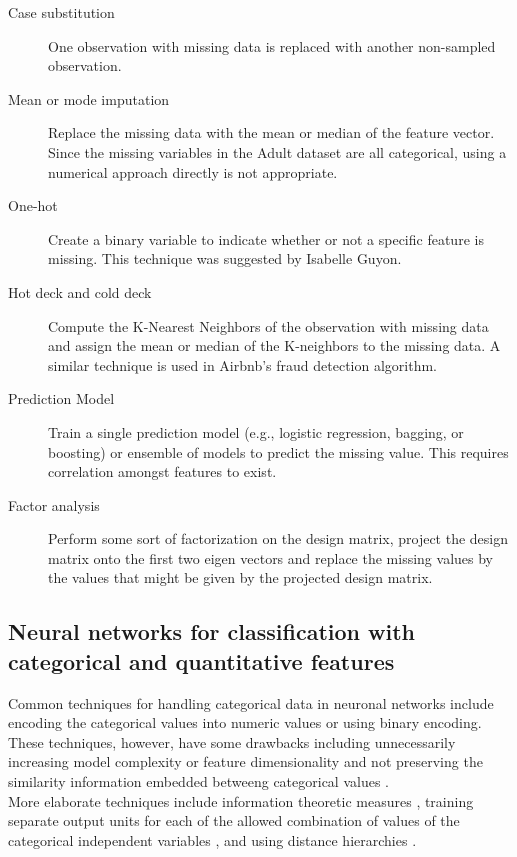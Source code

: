 \documentclass[12pt]{article}
\begin{document}
\begin{description}
\item[Case substitution] One observation with missing data is replaced with
another non-sampled observation.
\item[Mean or mode imputation] Replace the missing data with the mean or median of
    the feature vector. Since the missing variables in the Adult dataset are
    all categorical, using a numerical approach directly is not appropriate.
\item[One-hot] Create a binary variable to indicate whether or not a specific
    feature is missing. This technique was suggested by Isabelle Guyon.
\item[Hot deck and cold deck] Compute the K-Nearest Neighbors of the
    observation with missing data and assign the mean or median of the K-neighbors
    to the missing data. A similar technique is used in Airbnb's fraud detection
    algorithm.
\item[Prediction Model] Train a single prediction model (e.g., logistic regression,  
    bagging, or boosting) or ensemble of models to predict the missing value. This
    requires correlation amongst features to exist.
\item[Factor analysis] Perform some sort of factorization on the design
    matrix, project the design matrix onto the first two eigen vectors and
    replace the missing values by the values that might be given by the
    projected design matrix.
\end{description}

\subsection{Neural networks for classification with categorical and
quantitative features}  Common techniques for handling categorical data in
neuronal networks include encoding the categorical values into numeric values
or using binary encoding. These techniques, however, have some drawbacks
including unnecessarily increasing model complexity or feature dimensionality
and not preserving the similarity information embedded betweeng categorical
values \citep{hsu2006generalizing}.\\

More elaborate techniques include information theoretic measures
\citep{wang2008categorical}, training separate output units for
each of the allowed combination of values of the categorical independent
variables \citep{brouwer2002feed}, and using distance
hierarchies \citep{hsu2006generalizing}.

\pagebreak





\itemize
\end{document}
